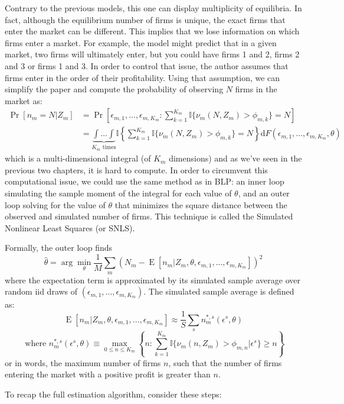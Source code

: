 \documentclass[12pt]{report}
\def\D{\mathrm{d}}
\newcommand{\E}[1]{\operatorname{E}\left[#1\right]}
\def\D{\mathrm{d}}
\newcommand{\prob}[1]{\operatorname{Pr}\left[#1\right]}
\begin{document}
Contrary to the previous models, this one can display multiplicity of equilibria. In fact, although the equilibrium number of firms is unique, the exact firms that enter the market can be different. This implies that we lose information on which firms enter a market. For example, the model might predict that in a given market, two firms will ultimately enter, but you could have firms 1 and 2, firms 2 and 3 or firms 1 and 3. In order to control that issue, the author assumes that firms enter in the order of their profitability. Using that assumption, we can simplify the paper and compute the probability of observing $N$ firms in the market as: \begin{align*}
\prob{n_m = N\vert Z_m} & = \prob{\epsilon_{m,1}, ..., \epsilon_{m,K_m} : \sum_{k=1}^{K_m}\mathbb{I}\{\nu_m(N, Z_m) >\phi_{m,k}\} = N } \\
& = \underbrace{\int\hdots\int}_{K_m\text{ times}}\mathbb{I}\left\lbrace\sum_{k=1}^{K_m}\mathbb{I}\{\nu_m(N, Z_m) >\phi_{m,k}\} = N\right\rbrace\D F(\epsilon_{m,1}, ..., \epsilon_{m,K_m}, \theta)
\end{align*} which is a multi-dimensional integral (of $K_m$ dimensions) and as we've seen in the previous two chapters, it is hard to compute. In order to circumvent this computational issue, we could use the same method as in BLP: an inner loop simulating the sample moment of the integral for each value of $\theta$, and an outer loop solving for the value of $\theta$ that minimizes the square distance between the observed and simulated number of firms. This technique is called the Simulated Nonlinear Least Squares (or SNLS).

Formally, the outer loop finds $$\hat\theta = \arg\min_{\theta} \frac{1}{M} \sum_{m} \left( N_m - \E{n_m\vert Z_m, \theta, \epsilon_{m,1}, ..., \epsilon_{m,K_m}} \right)^2 $$ where the expectation term is approximated by its simulated sample average over random iid draws of $(\epsilon_{m,1}, ..., \epsilon_{m,K_m})$. The simulated sample average is defined as: $$\E{n_m\vert Z_m, \theta, \epsilon_{m,1}, ..., \epsilon_{m,K_m}} \approx \frac{1}{S} \sum_{s} n_{m}^{*, s} (\epsilon^s, \theta) $$ $$\text{ where } n_{m}^{*, s} (\epsilon^s, \theta) \equiv \max_{0\leq n \leq K_m} \left\lbrace n : \sum_{k=1}^{K_m}\mathbb{I}\{\nu_m(n, Z_m) > \phi_{m,n}\vert \epsilon^s \}\geq n \right\rbrace $$ or in words, the maximum number of firms $n$, such that the number of firms entering the market with a positive profit is greater than $n$.

To recap the full estimation algorithm, consider these steps:
\end{document}

